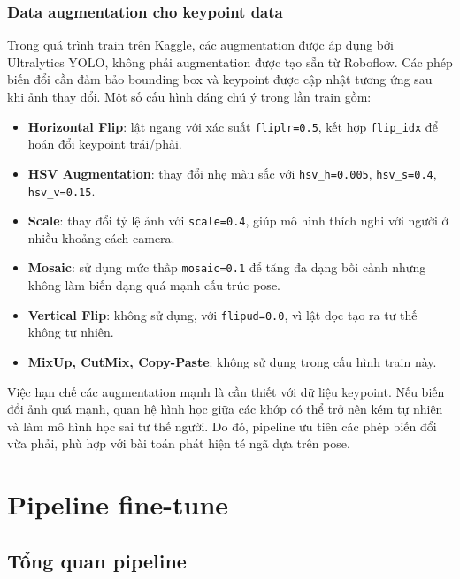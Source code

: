 \documentclass[12pt, a4paper]{article}
\begin{document}
\subsubsection{Data augmentation cho keypoint data}
Trong quá trình train trên Kaggle, các augmentation được áp dụng bởi Ultralytics YOLO, không phải augmentation được tạo sẵn từ Roboflow.
Các phép biến đổi cần đảm bảo bounding box và keypoint được cập nhật tương ứng sau khi ảnh thay đổi.
Một số cấu hình đáng chú ý trong lần train gồm:
\begin{itemize}
  \item \textbf{Horizontal Flip}: lật ngang với xác suất \texttt{fliplr=0.5}, kết hợp \texttt{flip\_idx} để hoán đổi keypoint trái/phải.
  \item \textbf{HSV Augmentation}: thay đổi nhẹ màu sắc với \texttt{hsv\_h=0.005}, \texttt{hsv\_s=0.4}, \texttt{hsv\_v=0.15}.
  \item \textbf{Scale}: thay đổi tỷ lệ ảnh với \texttt{scale=0.4}, giúp mô hình thích nghi với người ở nhiều khoảng cách camera.
  \item \textbf{Mosaic}: sử dụng mức thấp \texttt{mosaic=0.1} để tăng đa dạng bối cảnh nhưng không làm biến dạng quá mạnh cấu trúc pose.
  \item \textbf{Vertical Flip}: không sử dụng, với \texttt{flipud=0.0}, vì lật dọc tạo ra tư thế không tự nhiên.
  \item \textbf{MixUp, CutMix, Copy-Paste}: không sử dụng trong cấu hình train này.
\end{itemize}

Việc hạn chế các augmentation mạnh là cần thiết với dữ liệu keypoint.
Nếu biến đổi ảnh quá mạnh, quan hệ hình học giữa các khớp có thể trở nên kém tự nhiên và làm mô hình học sai tư thế người.
Do đó, pipeline ưu tiên các phép biến đổi vừa phải, phù hợp với bài toán phát hiện té ngã dựa trên pose.

\section{Pipeline fine-tune}
\label{sec:pipeline}

\subsection{Tổng quan pipeline}
\end{document}
